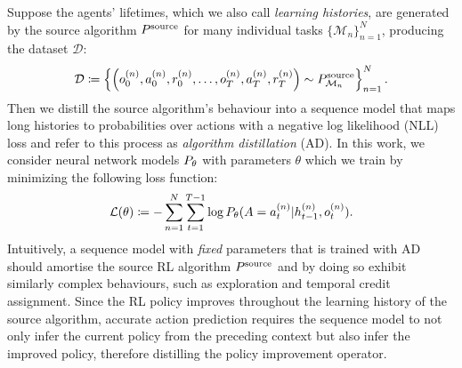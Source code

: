 Suppose the agents' lifetimes, which we also call {\it learning histories}, are generated by the source algorithm $P^{\text{source}}$ for many individual tasks $\{ \mathcal{M}_{n} \}_{n=1}^{N}$, producing the dataset $\mathcal{D}$:
%
\begin{align}
  \mathcal{D} \coloneqq \left\{ \left( o_{0}^{(n)}, a_{0}^{(n)}, r_{0}^{(n)}, \ldots, o_{T}^{(n)}, a_{T}^{(n)}, r_{T}^{(n)} \right) \sim P_{\mathcal{M}_{n}}^{\text{source}} \right\}_{n=1}^{N}.
  \label{eq:data}
\end{align}
%
Then we distill the source algorithm's behaviour into a sequence model that maps long histories to probabilities over actions with a negative log likelihood (NLL) loss and refer to this process as \emph{algorithm distillation} (AD).
In this work, we consider neural network models $P_{\theta}$ with parameters $\theta$ which we train by minimizing the following loss function:
%
\begin{align}
   \mathcal L(\theta) \coloneqq  -\sum_{n=1}^{N} \sum_{t=1}^{T-1} \log P_{\theta}(A=a_{t}^{(n)} \vert h_{t-1}^{(n)}, o_t^{(n)}).
\label{eq:thetastar}
\end{align}
%
Intuitively, a sequence model with \emph{fixed} parameters that is trained with AD should amortise the source RL algorithm $P^{\text{source}}$ and by doing so exhibit similarly complex behaviours, such as exploration and temporal credit assignment. Since the RL policy improves throughout the learning history of the source algorithm, accurate action prediction requires the sequence model to not only infer the current policy from the preceding context but also infer the improved policy, therefore distilling the policy improvement operator.

